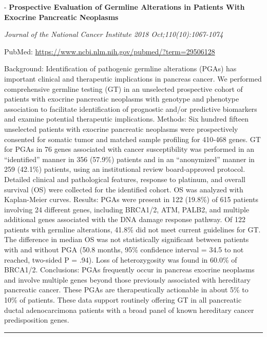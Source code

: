 \documentclass[]{article}
\begin{document}
 - \textbf{Prospective Evaluation of Germline Alterations in Patients
With Exocrine Pancreatic Neoplasms}

\emph{Journal of the National Cancer Institute 2018
Oct;110(10):1067-1074}

PubMed: \url{https://www.ncbi.nlm.nih.gov/pubmed/?term=29506128}

Background: Identification of pathogenic germline alterations (PGAs) has
important clinical and therapeutic implications in pancreas cancer. We
performed comprehensive germline testing (GT) in an unselected
prospective cohort of patients with exocrine pancreatic neoplasms with
genotype and phenotype association to facilitate identification of
prognostic and/or predictive biomarkers and examine potential
therapeutic implications. Methods: Six hundred fifteen unselected
patients with exocrine pancreatic neoplasms were prospectively consented
for somatic tumor and matched sample profiling for 410-468 genes. GT for
PGAs in 76 genes associated with cancer susceptibility was performed in
an ``identified'' manner in 356 (57.9\%) patients and in an
``anonymized'' manner in 259 (42.1\%) patients, using an institutional
review board-approved protocol. Detailed clinical and pathological
features, response to platinum, and overall survival (OS) were collected
for the identified cohort. OS was analyzed with Kaplan-Meier curves.
Results: PGAs were present in 122 (19.8\%) of 615 patients involving 24
different genes, including BRCA1/2, ATM, PALB2, and multiple additional
genes associated with the DNA damage response pathway. Of 122 patients
with germline alterations, 41.8\% did not meet current guidelines for
GT. The difference in median OS was not statistically significant
between patients with and without PGA (50.8 months, 95\% confidence
interval = 34.5 to not reached, two-sided P = .94). Loss of
heterozygosity was found in 60.0\% of BRCA1/2. Conclusions: PGAs
frequently occur in pancreas exocrine neoplasms and involve multiple
genes beyond those previously associated with hereditary pancreatic
cancer. These PGAs are therapeutically actionable in about 5\% to 10\%
of patients. These data support routinely offering GT in all pancreatic
ductal adenocarcimona patients with a broad panel of known hereditary
cancer predisposition genes.

{}

{}

\begin{center}\rule{0.5\linewidth}{\linethickness}\end{center}
\end{document}
